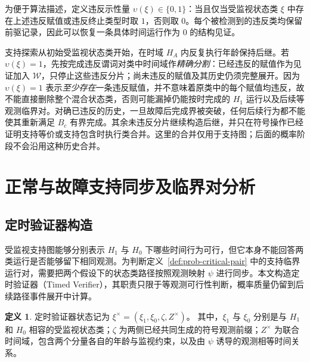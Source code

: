 \documentclass[master,fontset=ubuntu]{shnuthesis}
\DeclareRobustCommand{\probstatus}[1]{\ensuremath{#1}}
\theoremstyle{definition}
\newtheorem{thesisdefinition}{定义}
\begin{document}
为便于算法描述，定义违反示性量 \(\upsilon(\xi)\in\{0,1\}\)：当且仅当受监视状态类 \(\xi\) 中存在上述违反赋值或违反终止类型时取 \(1\)，否则取 \(0\)。每个被检测到的违反类均保留前驱记录，因此可以恢复一条具体时间运行作为 \probstatus{0} 的结构见证。

支持探索从初始受监视状态类开始，在时域 \(H_A\) 内反复执行年龄保持后继。若 \(\upsilon(\xi)=1\)，先按完成违反谓词对类中时间域作\emph{精确分割}：已经违反的赋值作为见证加入 \(\mathcal W\)，只停止这些违反分片；尚未违反的赋值及其历史仍须完整展开。因为 \(\upsilon(\xi)=1\) 表示\emph{至少存在}一条违反赋值，并不意味着原类中的每个赋值均违反，故不能直接删除整个混合状态类，否则可能漏掉仍能按时完成的 \(H_1\) 运行以及后续等观测临界对。对确已违反的历史，一旦故障后完成界被突破，任何后续行为都不能使其重新满足 \(B_c\) 有界完成。其余未违反分片继续构造后继，并只在符号操作已经证明支持等价或支持包含时执行类合并。这里的合并仅用于支持图；后面的概率阶段不会沿用这种历史合并。

\section{正常与故障支持同步及临界对分析}

\subsection{定时验证器构造}

受监视支持图能够分别表示 \(H_1\) 与 \(H_0\) 下哪些时间行为可行，但它本身不能回答两类运行是否能够留下相同观测。为判断定义~\ref{def:prob-critical-pair} 中的支持临界运行对，需要把两个假设下的状态类路径按照观测映射 \(\psi\) 进行同步。本文构造定时验证器（Timed Verifier），其职责只限于等观测可行性判断，概率质量仍留到后续路径事件展开中计算。

\begin{thesisdefinition}
\label{def:timed-verifier-state}
定时验证器状态记为
\(\xi^\times=(\xi_1,\xi_0,\zeta,Z^\times)\)。
其中，\(\xi_1\) 与 \(\xi_0\) 分别是与 \(H_1\) 和 \(H_0\) 相容的受监视状态类；\(\zeta\) 为两侧已经共同生成的符号观测前缀；\(Z^\times\) 为联合时间域，包含两个分量各自的年龄与监视约束，以及由 \(\psi\) 诱导的观测相等时间关系。
\end{thesisdefinition}
\end{document}
